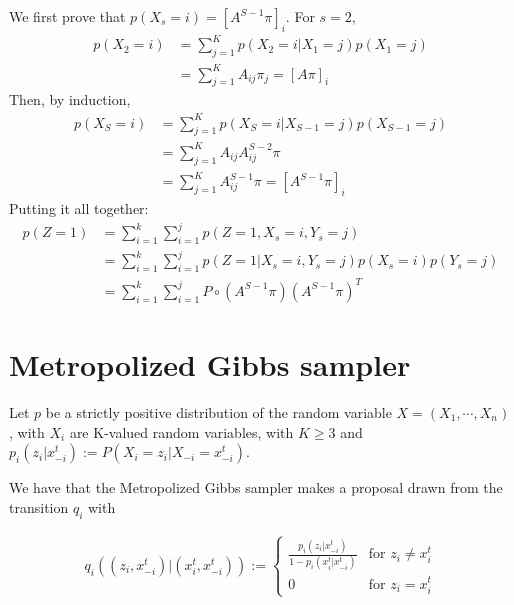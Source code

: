 \documentclass[paper=a4, fontsize=11pt]{scrartcl} %
\numberwithin{equation}{section} %
\numberwithin{figure}{section} %
\numberwithin{table}{section} %
\begin{document}
We first prove that $p(X_s=i)=[A^{S-1}\pi]_i$.  For $s=2$,
\begin{align*}
p(X_2=i) &= \sum_{j=1}^{K}p(X_2=i|X_1=j)p(X_1=j) \\
&=\sum_{j=1}^{K}A_{ij}\pi_j = [A\pi]_i
\end{align*}
Then, by induction,
\begin{align*}
p(X_S=i) &= \sum_{j=1}^{K}p(X_S=i|X_{S-1}=j)p(X_{S-1}=j) \\
&= \sum_{j=1}^{K}A_{ij}A_{ij}^{S-2}\pi\\
&= \sum_{j=1}^{K}A_{ij}^{S-1}\pi = [A^{S-1}\pi]_i
\end{align*}
Putting it all together:
\begin{align*}
p(Z=1) &= \sum_{i=1}^{k}\sum_{i=1}^{j}p(Z=1,X_s=i,Y_s=j)\\
&=\sum_{i=1}^{k}\sum_{i=1}^{j}p(Z=1|X_s=i,Y_s=j)p(X_s=i)p(Y_s=j)\\
&=\sum_{i=1}^{k}\sum_{i=1}^{j} P \circ (A^{S-1}\pi)(A^{S-1}\pi)^T
\end{align*}

\section{Metropolized Gibbs sampler}

Let $p$ be a strictly positive distribution of the random variable
$X = (X_1 , \cdots , X_n)$, with $X_i$ are K-valued random variables, with $K \ge 3$ and $p_i( z_i | x^t_{-i} ) := P(X_i = z_i | X_{-i} = x^t_{-i} )$.

We have that the Metropolized Gibbs sampler makes a proposal drawn from
the transition $q_i$ with

\begin{align}
q_i( (z_i, x^t_{-i})| (x^t_i, x^t_{-i})) := \begin{cases}
\frac{p_i( z_i | x^t_{-i} )}{1-p_i( x^{t}_i | x^t_{-i} )} & \text{for } z_i \ne x^t_{i}\\ 0 & \text{for } z_i = x^t_{i}
\end{cases}
\end{align}
\end{document}
